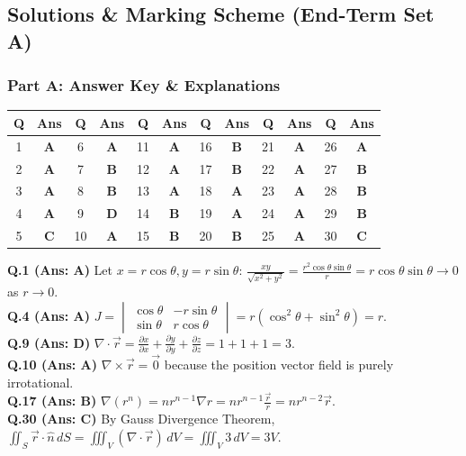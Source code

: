 \subsection*{Solutions \& Marking Scheme (End-Term Set A)}

\subsubsection*{Part A: Answer Key \& Explanations}

\begin{center}
\begin{tabular}{|c|c||c|c||c|c||c|c||c|c||c|c|}
\hline
\textbf{Q} & \textbf{Ans} & \textbf{Q} & \textbf{Ans} & \textbf{Q} & \textbf{Ans} & \textbf{Q} & \textbf{Ans} & \textbf{Q} & \textbf{Ans} & \textbf{Q} & \textbf{Ans} \\
\hline
1 & \textbf{A} & 6 & \textbf{A} & 11 & \textbf{A} & 16 & \textbf{B} & 21 & \textbf{A} & 26 & \textbf{A} \\
2 & \textbf{A} & 7 & \textbf{B} & 12 & \textbf{A} & 17 & \textbf{B} & 22 & \textbf{A} & 27 & \textbf{B} \\
3 & \textbf{A} & 8 & \textbf{B} & 13 & \textbf{A} & 18 & \textbf{A} & 23 & \textbf{A} & 28 & \textbf{B} \\
4 & \textbf{A} & 9 & \textbf{D} & 14 & \textbf{B} & 19 & \textbf{A} & 24 & \textbf{A} & 29 & \textbf{B} \\
5 & \textbf{C} & 10 & \textbf{A} & 15 & \textbf{B} & 20 & \textbf{B} & 25 & \textbf{A} & 30 & \textbf{C} \\
\hline
\end{tabular}
\end{center}

\begin{solutionbox}
\textbf{Q.1 (Ans: A)} Let $x = r\cos\theta, y = r\sin\theta$: $\frac{xy}{\sqrt{x^2+y^2}} = \frac{r^2\cos\theta\sin\theta}{r} = r\cos\theta\sin\theta \to 0$ as $r\to 0$.\\[1.5mm]
\textbf{Q.4 (Ans: A)} $J = \begin{vmatrix} \cos\theta & -r\sin\theta \\ \sin\theta & r\cos\theta \end{vmatrix} = r(\cos^2\theta + \sin^2\theta) = r$.\\[1.5mm]
\textbf{Q.9 (Ans: D)} $\nabla \cdot \vec{r} = \frac{\partial x}{\partial x} + \frac{\partial y}{\partial y} + \frac{\partial z}{\partial z} = 1 + 1 + 1 = 3$.\\[1.5mm]
\textbf{Q.10 (Ans: A)} $\nabla \times \vec{r} = \vec{0}$ because the position vector field is purely irrotational.\\[1.5mm]
\textbf{Q.17 (Ans: B)} $\nabla(r^n) = n r^{n-1}\nabla r = n r^{n-1}\frac{\vec{r}}{r} = n r^{n-2}\vec{r}$.\\[1.5mm]
\textbf{Q.30 (Ans: C)} By Gauss Divergence Theorem, $\iint_S \vec{r} \cdot \hat{n} \, dS = \iiint_V (\nabla \cdot \vec{r}) \, dV = \iiint_V 3 \, dV = 3V$.
\end{solutionbox}

